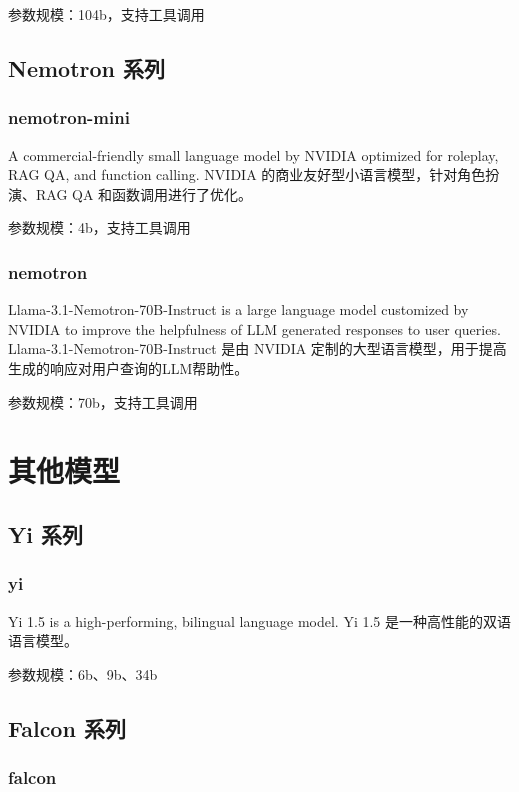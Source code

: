 \documentclass[12pt,UTF8]{ctexbook}
\begin{document}
参数规模：104b，支持工具调用

\section{Nemotron 系列}

\subsection{nemotron-mini}

A commercial-friendly small language model by NVIDIA optimized for roleplay, RAG QA, and function calling.
NVIDIA 的商业友好型小语言模型，针对角色扮演、RAG QA 和函数调用进行了优化。

参数规模：4b，支持工具调用

\subsection{nemotron}

Llama-3.1-Nemotron-70B-Instruct is a large language model customized by NVIDIA to improve the helpfulness of LLM generated responses to user queries.
Llama-3.1-Nemotron-70B-Instruct 是由 NVIDIA 定制的大型语言模型，用于提高生成的响应对用户查询的LLM帮助性。

参数规模：70b，支持工具调用

\chapter{其他模型}

\section{Yi 系列}

\subsection{yi}

Yi 1.5 is a high-performing, bilingual language model.
Yi 1.5 是一种高性能的双语语言模型。

参数规模：6b、9b、34b

\section{Falcon 系列}

\subsection{falcon}
\end{document}
